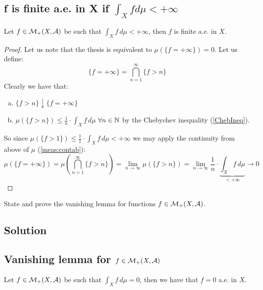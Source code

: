 \subsection{f is finite a.e. in X if \texorpdfstring{$\int_X f d\mu < +\infty$}{ its integral is finite}}
Let $f \in \mathcal{M}_+(X, \mathcal{A})$ be such that $\int_X f \, d\mu < +\infty$, then $f$ is finite a.e. in $X$.

\begin{proof}
    Let us note that the thesis is equivalent to $\mu(\{ f = +\infty\}) = 0$. Let us define:
    \[
        \{ f = + \infty \} = \bigcap_{n=1}^\infty \{ f > n \}    
    \]
    Clearly we have that:
    \begin{enumerate}[a)]
        \item $\{ f > n\} \downarrow \{ f = +\infty \}$
        \item $\mu (\{ f > n \}) \leq \frac{1}{n}\cdot \int_X f\, d\mu$ $\forall n\in\mathbb{N}$ by the Chebychev inequality (\ref{ChebIneq}).
    \end{enumerate}
    So since $\mu(\{f > 1\}) \leq \frac{1}{1}\cdot \int_X f \, d\mu < +\infty$ we may apply the continuity from above of $\mu$ (\ref{meas:contab}):
    \[
        \mu (\{ f= +\infty \}) = \mu \left( \bigcap_{n=1}^\infty \{f>n\} \right) = \lim_{n\to\infty} \mu(\{f>n\}) = \lim_{n\to\infty} \frac{1}{n}\cdot \underbrace{\int_X f \, d\mu}_{<+\infty} \longrightarrow 0  
    \]
\end{proof}


\question

State and prove the vanishing lemma for functions $f \in \mathcal{M}_+(X, \mathcal{A})$.

\subsection*{Solution}

\subsection{Vanishing lemma for \texorpdfstring{$f \in \mathcal{M}_+(X, \mathcal{A})$}{nonnegative measurable functions}}

Let $f \in \mathcal{M}_+(X, \mathcal{A})$ be such that $\int_X f \, d\mu = 0 $, then we have that $f=0$ a.e. in $X$.

